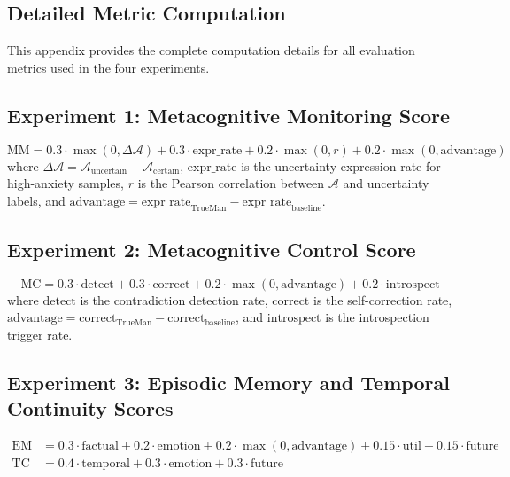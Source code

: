 \documentclass[pdflatex,sn-mathphys-num]{sn-jnl}
\newcommand{\anxiety}{\mathcal{A}}
\theoremstyle{thmstyleone}%
\theoremstyle{thmstyletwo}%
\theoremstyle{thmstylethree}%
\begin{document}
\begin{appendices}

\section{Detailed Metric Computation}\label{secA1}

This appendix provides the complete computation details for all evaluation metrics used in the four experiments.

\subsection{Experiment 1: Metacognitive Monitoring Score}

\begin{equation}
\text{MM} = 0.3 \cdot \max(0, \Delta\anxiety) + 0.3 \cdot \text{expr\_rate} + 0.2 \cdot \max(0, r) + 0.2 \cdot \max(0, \text{advantage})
\end{equation}
where $\Delta\anxiety = \bar{\anxiety}_{\text{uncertain}} - \bar{\anxiety}_{\text{certain}}$, $\text{expr\_rate}$ is the uncertainty expression rate for high-anxiety samples, $r$ is the Pearson correlation between $\anxiety$ and uncertainty labels, and $\text{advantage} = \text{expr\_rate}_{\text{TrueMan}} - \text{expr\_rate}_{\text{baseline}}$.

\subsection{Experiment 2: Metacognitive Control Score}

\begin{equation}
\text{MC} = 0.3 \cdot \text{detect} + 0.3 \cdot \text{correct} + 0.2 \cdot \max(0, \text{advantage}) + 0.2 \cdot \text{introspect}
\end{equation}
where $\text{detect}$ is the contradiction detection rate, $\text{correct}$ is the self-correction rate, $\text{advantage} = \text{correct}_{\text{TrueMan}} - \text{correct}_{\text{baseline}}$, and $\text{introspect}$ is the introspection trigger rate.

\subsection{Experiment 3: Episodic Memory and Temporal Continuity Scores}

\begin{align}
\text{EM} &= 0.3 \cdot \text{factual} + 0.2 \cdot \text{emotion} + 0.2 \cdot \max(0, \text{advantage}) + 0.15 \cdot \text{util} + 0.15 \cdot \text{future} \\
\text{TC} &= 0.4 \cdot \text{temporal} + 0.3 \cdot \text{emotion} + 0.3 \cdot \text{future}
\end{align}


\end{appendices}
\end{document}
